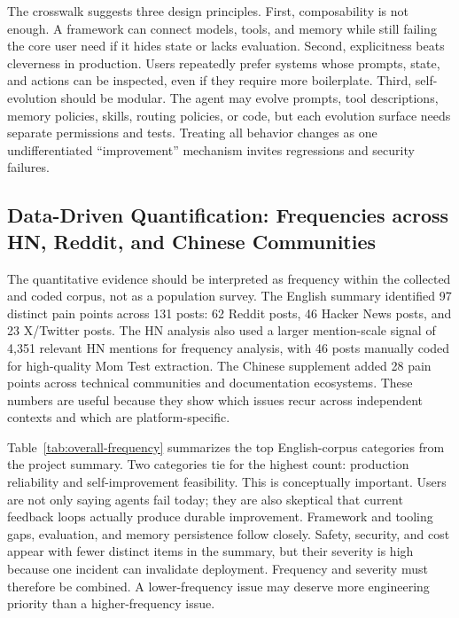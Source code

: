 The crosswalk suggests three design principles. First, composability is not enough. A framework can connect models, tools, and memory while still failing the core user need if it hides state or lacks evaluation. Second, explicitness beats cleverness in production. Users repeatedly prefer systems whose prompts, state, and actions can be inspected, even if they require more boilerplate. Third, self-evolution should be modular. The agent may evolve prompts, tool descriptions, memory policies, skills, routing policies, or code, but each evolution surface needs separate permissions and tests. Treating all behavior changes as one undifferentiated ``improvement'' mechanism invites regressions and security failures.

\subsection{Data-Driven Quantification: Frequencies across HN, Reddit, and Chinese Communities}
\label{subsec:data-quantification}

The quantitative evidence should be interpreted as frequency within the collected and coded corpus, not as a population survey. The English summary identified 97 distinct pain points across 131 posts: 62 Reddit posts, 46 Hacker News posts, and 23 X/Twitter posts. The HN analysis also used a larger mention-scale signal of 4,351 relevant HN mentions for frequency analysis, with 46 posts manually coded for high-quality Mom Test extraction. The Chinese supplement added 28 pain points across technical communities and documentation ecosystems. These numbers are useful because they show which issues recur across independent contexts and which are platform-specific.

Table~\ref{tab:overall-frequency} summarizes the top English-corpus categories from the project summary. Two categories tie for the highest count: production reliability and self-improvement feasibility. This is conceptually important. Users are not only saying agents fail today; they are also skeptical that current feedback loops actually produce durable improvement. Framework and tooling gaps, evaluation, and memory persistence follow closely. Safety, security, and cost appear with fewer distinct items in the summary, but their severity is high because one incident can invalidate deployment. Frequency and severity must therefore be combined. A lower-frequency \sevcritical{} issue may deserve more engineering priority than a higher-frequency \sevmedium{} issue.


